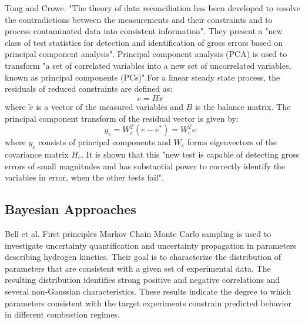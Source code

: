 	
Tong and Crowe\cite{tong_detection_1995}. "The theory of data reconciliation has been developed to resolve the contradictions between the measurements and their constraints and to process contaminated data into consistent information". They present a "new class of test statistics for detection and identification of gross errors based on principal component analysis". Principal component analysis (PCA) is used to transform "a set of correlated variables into a new set of uncorrelated variables, known as principal components (PCs)".For a linear steady state process, the residuals of reduced constraints are defined as:
\begin{equation}
	e = B\tilde{x} \text{ }
\end{equation}
where $\tilde{x}$ is a vector of the measured variables and $B$ is the balance matrix. The principal component transform of the residual vector is given by:
\begin{equation}
	y_e = W_e^T(e - e^*) = W_e^Te \text{ }
\end{equation}
where $y_e$ consists of principal components and $W_e$ forms eigenvectors of the covariance matrix $H_e$. It is shown that this "new test is capable of detecting gross errors of small magnitudes and has substantial power to correctly identify the variables in error, when the other tests fail".


\subsection{Bayesian Approaches}


Bell et al.\cite{bell_bayesian_2018} First principles Markov Chain Monte Carlo sampling is used to investigate uncertainty quantification and uncertainty propagation in parameters describing hydrogen kinetics. Their goal is to characterize the distribution of parameters that are consistent with a given set of experimental data. The resulting distribution identifies strong positive and negative correlations and several non-Gaussian characteristics. These results indicate the degree to which parameters consistent with the target experiments constrain predicted behavior in different combustion regimes.

